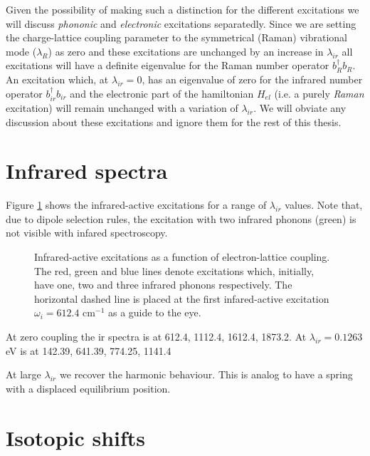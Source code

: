 Given the possibility of making such a distinction for the different excitations we will discuss \textit{phononic} and \textit{electronic} excitations separatedly. 
Since we are setting the charge-lattice coupling parameter to the symmetrical (Raman) vibrational mode ($\lambda_R$) as zero and these excitations are unchanged by an increase in $\lambda_{ir}$ all excitations will have a definite eigenvalue for the Raman number operator $b_R^\dagger b_R$. 
An excitation which, at $\lambda_{ir}=0$, has an eigenvalue of zero for the infrared number operator $b_{ir}^\dagger b_{ir}$ and the electronic part of the hamiltonian $H_{el}$ (i.e. a purely \textit{Raman} excitation) will remain unchanged with a variation of $\lambda_{ir}$.
We will obviate any discussion about these excitations and ignore them for the rest of this thesis. 


\section{Infrared spectra}
\label{sec:irSpectra}

Figure \ref{fig:irSpectra} shows the infrared-active excitations for a range of $\lambda_{ir}$ values.
Note that, due to dipole selection rules, the excitation with two infrared phonons (green) is not visible with infared spectroscopy.

\begin{figure}[ht]
  \centering
  
  \caption[Infrared-active excitations as a function of electron-lattice coupling.]
  {Infrared-active excitations as a function of electron-lattice coupling.
  The red, green and blue lines denote excitations which, initially, have one, two and three infrared phonons respectively.
  The horizontal dashed line is placed at the first infared-active excitation $\omega_i=612.4$ cm$^{-1}$ as a guide to the eye.}
  \label{fig:irSpectra}
\end{figure}

At zero coupling the ir spectra is at 612.4, 1112.4, 1612.4, 1873.2.
At $\lambda_{ir}=0.1263$ eV is at 142.39, 641.39, 774.25, 1141.4 

At large $\lambda_{ir}$ we recover the harmonic behaviour. This is analog to have a spring with a displaced equilibrium position.


\section{Isotopic shifts}
\label{sec:irIsotopicShifts}

